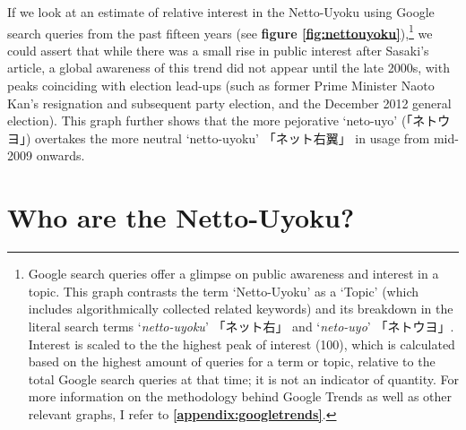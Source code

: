 \documentclass[10pt,british,A4paper,,openany]{memoir}
\begin{document}
If we look at an estimate of relative interest in the Netto-Uyoku using
Google search queries from the past fifteen years (see \textbf{figure
\ref{fig:nettouyoku}}),\footnote{Google search queries offer a glimpse
  on public awareness and interest in a topic. This graph contrasts the
  term `Netto-Uyoku' as a `Topic' (which includes algorithmically
  collected related keywords) and its breakdown in the literal search
  terms `\emph{netto-uyoku}' 「ネット右」 and `\emph{neto-uyo}'
  「ネトウヨ」. Interest is scaled to the the highest peak of interest
  (100), which is calculated based on the highest amount of queries for
  a term or topic, relative to the total Google search queries at that
  time; it is not an indicator of quantity. For more information on the
  methodology behind Google Trends as well as other relevant graphs, I
  refer to \textbf{\ref{appendix:googletrends}}.} we could assert that
while there was a small rise in public interest after Sasaki's article,
a global awareness of this trend did not appear until the late 2000s,
with peaks coinciding with election lead-ups (such as former Prime
Minister Naoto Kan's resignation and subsequent party election, and the
December 2012 general election). This graph further shows that the more
pejorative `neto-uyo' (「ネトウヨ」) overtakes the more neutral
`netto-uyoku' 「ネット右翼」 in usage from mid-2009 onwards.

\section{Who are the Netto-Uyoku?}\label{who-are-the-netto-uyoku}
\end{document}
